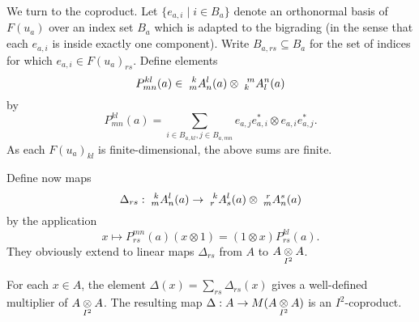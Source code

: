 We turn to the coproduct. Let $\{e_{a,i}\mid i\in B_a\}$ denote an orthonormal basis of $F(u_a)$ over an index set $B_a$ which is adapted to the bigrading (in the sense that each $e_{a,i}$ is inside exactly one component). Write $B_{a,rs}\subseteq B_a$ for the set of indices for which $e_{a,i}\in F(u_a)_{rs}$. Define elements \[P^{kl}_{mn}(a)\in \Gr{A}{k}{l}{m}{n}(a) \otimes \Gr{A}{m}{n}{k}{l}(a)\] by \[P^{kl}_{mn}(a) = \sum_{i\in B_{a,kl},j\in B_{a,mn}}  e_{a,j}e_{a,i}^*\otimes e_{a,i}e_{a,j}^*.\] As each $F(u_a)_{kl}$ is finite-dimensional, the above sums are finite.




Define now maps \[\Delta_{rs}: \Gr{A}{k}{l}{m}{n}(a) \rightarrow \Gr{A}{k}{l}{r}{s}(a)\otimes \Gr{A}{r}{s}{m}{n}(a)\] by the application \[x \mapsto P_{rs}^{mn}(a) (x\otimes 1) = (1\otimes x)P_{rs}^{kl}(a).\] They obviously extend to linear maps $\Delta_{rs}$ from $A$ to $A\itimes A$.

\begin{Lem} For each $x\in A$, the element $\Delta(x) = \sum_{rs}\Delta_{rs}(x)$ gives a well-defined multiplier of $A\itimes A$. The resulting map $\Delta: A\rightarrow M(A\itimes A)$ is an $I^2$-coproduct.
\end{Lem}

